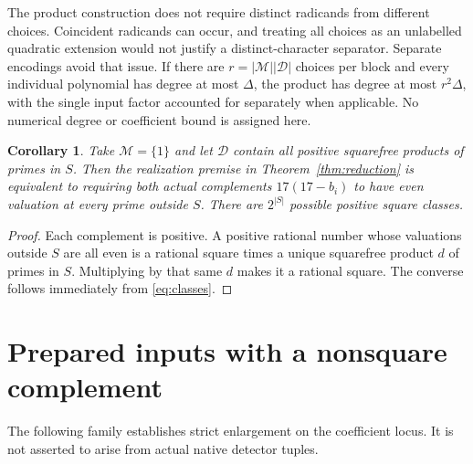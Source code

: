 \documentclass[11pt,a4paper]{article}
\newtheorem{corollary}[theorem]{Corollary}
\begin{document}
The product construction does not require distinct radicands from
different choices. Coincident radicands can occur, and treating all
choices as an unlabelled quadratic extension would not justify a
distinct-character separator. Separate encodings avoid that issue.
If there are $r=|\mathcal M||\mathcal D|$ choices per block and every
individual polynomial has degree at most $\Delta$, the product has
degree at most $r^2\Delta$, with the single input factor accounted for
separately when applicable. No numerical degree or coefficient bound
is assigned here.

\begin{corollary}\label{cor:allclasses}
Take $\mathcal M=\{1\}$ and let $\mathcal D$ contain all positive
squarefree products of primes in $S$. Then the realization premise
in Theorem~\ref{thm:reduction} is equivalent to requiring both actual
complements $17(17-b_i)$ to have even valuation at every prime outside
$S$. There are $2^{|S|}$ possible positive square classes.
\end{corollary}
\begin{proof}
Each complement is positive. A positive rational number whose valuations
outside $S$ are all even is a rational square times a unique squarefree
product $d$ of primes in $S$. Multiplying by that same $d$ makes it a
rational square. The converse follows immediately from
\eqref{eq:classes}.
\end{proof}

\section{Prepared inputs with a nonsquare complement}
The following family establishes strict enlargement on the coefficient
locus. It is not asserted to arise from actual native detector tuples.
\end{document}
